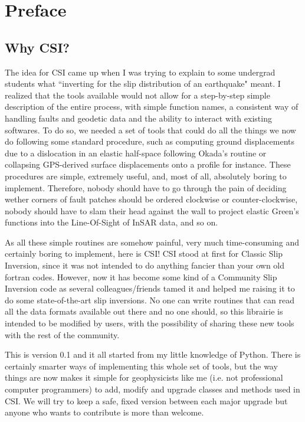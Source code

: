 \chapter*{Preface}

\section{Why CSI?}

	The idea for CSI came up when I was trying to explain to some undergrad students what ``inverting for the slip distribution of an earthquake" meant. I realized that the tools available would not allow for a step-by-step simple description of the entire process, with simple function names, a consistent way of handling faults and geodetic data and the ability to interact with existing softwares. To do so, we needed a set of tools that could do all the things we now do following some standard procedure, such as computing ground displacements due to a dislocation in an elastic half-space following Okada's routine or collapsing GPS-derived surface displacements onto a profile for instance. These procedures are simple, extremely useful, and, most of all, absolutely boring to implement. Therefore, nobody should have to go through the pain of deciding wether corners of fault patches should be ordered clockwise or counter-clockwise, nobody should have to slam their head against the wall to project elastic Green's functions into the Line-Of-Sight of InSAR data, and so on. 
	
	As all these simple routines are somehow painful, very much time-consuming and certainly boring to implement, here is CSI! CSI stood at first for Classic Slip Inversion, since it was not intended to do anything fancier than your own old fortran codes. However, now it has become some kind of a Community Slip Inversion code as several colleagues/friends tamed it and helped me raising it to do some state-of-the-art slip inversions. No one can write routines that can read all the data formats available out there and no one should, so this librairie is intended to be modified by users, with the possibility of sharing these new tools with the rest of the community. 
	
	This is version 0.1 and it all started from my little knowledge of Python. There is certainly smarter ways of implementing this whole set of tools, but the way things are now makes it simple for geophysicists like me (i.e. not professional computer programmers) to add, modify and upgrade classes and methods used in CSI. We will try to keep a safe, fixed version between each major upgrade but anyone who wants to contribute is more than welcome.

